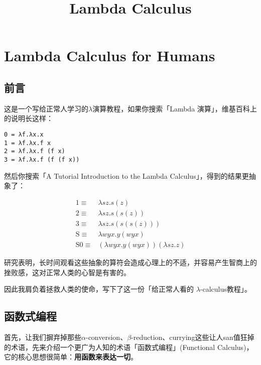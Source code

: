 \documentclass[11pt]{ctexart}
\title{Lambda Calculus}
\begin{document}
    
    \maketitle
    
    

    
    \hypertarget{lambda-calculus-for-humans}{%
\section{Lambda Calculus for Humans}\label{lambda-calculus-for-humans}}

\hypertarget{ux524dux8a00}{%
\subsection{前言}\label{ux524dux8a00}}

这是一个写给正常人学习的\(𝜆\)演算教程，如果你搜索「Lambda
演算」，维基百科上的说明长这样：

\begin{verbatim}
0 = λf.λx.x
1 = λf.λx.f x
2 = λf.λx.f (f x)
3 = λf.λx.f (f (f x))
\end{verbatim}

然后你搜索「A Tutorial Introduction to the Lambda
Calculus」，得到的结果更抽象了：

\[
\begin{aligned}
1 \equiv& \lambda s z .s(z) \\
2 \equiv& \lambda s z .s(s(z)) \\
3 \equiv& \lambda s z .s(s(s(z)))\\
\mathrm{S} \equiv& \lambda wyx.y(wyx)\\
\mathrm{S0} \equiv& (\lambda wyx.y(wyx))(\lambda sz.z)
\end{aligned}
\]

研究表明，长时间观看这些抽象的算符会造成心理上的不适，并容易产生智商上的挫败感，这对正常人类的心智是有害的。

因此我肩负着拯救人类的使命，写下了这一份「给正常人看的
\(λ\)-calculus教程」。

\hypertarget{ux51fdux6570ux5f0fux7f16ux7a0b}{%
\subsection{函数式编程}\label{ux51fdux6570ux5f0fux7f16ux7a0b}}

首先，让我们摒弃掉那些\(α\)-conversion、\(β\)-reduction、currying这些让人san值狂掉的术语，先来介绍一个更广为人知的术语「函数式编程」(Functional
Calculus)，它的核心思想很简单：\textbf{用函数来表达一切}。
\end{document}
